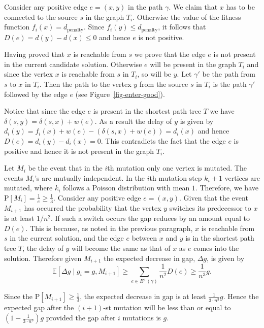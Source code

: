 \documentclass{sig-alternate}
\makeatletter
\newcommand{\E}{{\mathbb{E}}}   %
\DeclareRobustCommand{\qed}{\ifmmode\mathqed\else\leavevmode\unskip\penalty9999\hbox{}\nobreak\hfill\quad\hbox{\qedsymbol}\fi}
\let\QED@stack\@empty
\let\qed@elt\relax
\newcommand{\pushQED}[1]{\toks@{\qed@elt{#1}}\@temptokena\expandafter{\QED@stack}\xdef\QED@stack{\the\toks@\the\@temptokena}}
\newcommand{\popQED}{\begingroup\let\qed@elt\popQED@elt \QED@stack\relax\relax\endgroup}
\def\popQED@elt#1#2\relax{#1\gdef\QED@stack{#2}}
\newcommand{\mathqed}{\quad\hbox{\qedsymbol}}
\newcommand{\openbox}{\leavevmode\hbox to.77778em{\hfil\vrule\vbox to.675em{\hrule width.6em\vfil\hrule}\vrule\hfil}}
\providecommand{\qedsymbol}{\openbox}
\renewenvironment{proof}[1][\proofname]{\par\pushQED{\qed}\normalfont\topsep6\p@\@plus6\p@\relax\trivlist\item[\hskip\labelsep\itshape #1\@addpunct{.}]\ignorespaces}{\popQED\endtrivlist\@endpefalse}
\providecommand{\proofname}{Proof}
\makeatother
\begin{document}
\begin{proof}
  Consider any positive edge $e = (x,y)$ in the path $\gamma$. We
  claim that $x$ has to be connected to the source $s$ in the graph
  $T_i$. Otherwise the value of the fitness function $f_i(x) =
  d_{\mathrm{penalty}}$. Since $f_i(y) \leq d_{\mathrm{penalty}}$, it
  follows that $D(e) = d(y) - d(x) \leq 0$ and hence $e$ is not
  positive.

  Having proved that $x$ is reachable from $s$ we prove that the edge
  $e$ is not present in the current candidate solution. Otherwise $e$
  will be present in the graph $T_i$ and since the vertex $x$ is
  reachable from $s$ in $T_i$, so will be $y$. Let $\gamma'$ be the
  path from $s$ to $x$ in $T_i$.  Then the path to the vertex $y$ from
  the source $s$ in $T_i$ is the path $\gamma'$ followed by the edge
  $e$ (see Figure~\ref{fig-enter-good}).

  Notice that since the edge $e$ is present in the shortest path tree
  $T$ we have $\delta(s,y) = \delta(s,x) + w(e)$. As a result the
  delay of $y$ is given by $d_i(y) = f_i(x) + w(e) - (\delta(s,x) +
  w(e)) = d_i(x)$ and hence $D(e) = d_i(y) - d_i(x) = 0$. This
  contradicts the fact that the edge $e$ is positive and hence it is
  not present in the graph $T_i$.
  
  Let $M_i$ be the event that in the $i$th mutation only one vertex is
  mutated. The events $M_i$'s are mutually independent. In the $i$th mutation step $k_i + 1$ vertices are mutated, where $k_i$ follows a
  Poisson distribution with mean $1$. Therefore, we have $\mathrm{P}[M_i] =
  \frac{1}{e} \geq \frac{1}{3}$. Consider any positive edge $e =
  (x,y)$. Given that the event $M_{i+1}$ has occurred the probability
  that the vertex $y$ switches its predecessor to $x$ is at least
  $1/n^2$. If such a switch occurs the gap reduces by an
  amount equal to $D(e)$.
  This is because, as noted in the previous paragraph, $x$ is reachable
  from $s$ in the current solution, and the edge $e$ between $x$ and $y$
  is in the shortest path tree $T$, the delay of $y$ will become the
  same as that of $x$ as $e$ comes into the solution.
  Therefore given $M_{i+1}$ the expected
  decrease in gap, ${\scriptstyle\Delta} g$, is given by
  \[
  \E[{\scriptstyle \Delta} g \mid  g_i = g, M_{i+1}] \geq \sum_{e \in
  E^{+}(\gamma)}\frac{1}{n^2} D(e) \geq \frac{1}{n^3}g.
  \]

  Since the $\mathrm{P}[M_{i+1}] \geq \frac{1}{3}$, the expected
  decrease in gap is at least $\frac{1}{3\cdot n^3}g$. Hence the
  expected gap after the $(i+1)$-st mutation will be less than or equal
  to $(1-\frac{1}{3\cdot n^3})g$ provided the gap after $i$ mutations
  is $g$.
\end{proof}
\end{document}
